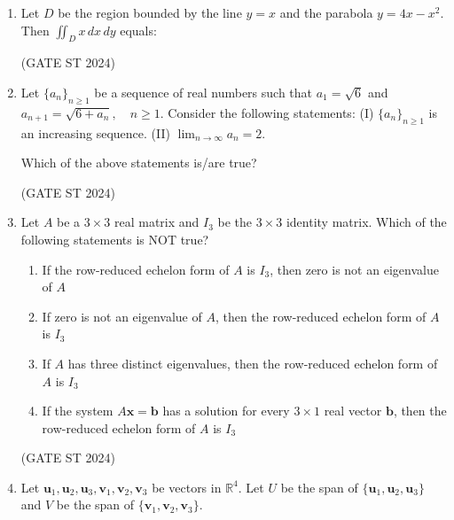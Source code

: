 \documentclass[journal,12pt,onecolumn]{IEEEtran}
\theoremstyle{remark}
\begin{document}
\begin{enumerate}
\item 
Let $D$ be the region bounded by the line $y = x$ and the parabola $y = 4x - x^2$. Then
$
\iint_{D} x \, dx \, dy
$
equals:

\begin{enumerate}
\end{enumerate}
\hfill (GATE ST 2024)
\item 
Let $\{a_n\}_{n \ge 1}$ be a sequence of real numbers such that $a_1 = \sqrt{6}$ and
$
a_{n+1} = \sqrt{6 + a_n}, \quad n \ge 1.
$
Consider the following statements:  
(I) $\{a_n\}_{n \ge 1}$ is an increasing sequence.  
(II) $\lim_{n \to \infty} a_n = 2$.

Which of the above statements is/are true?

\begin{enumerate}
\end{enumerate}
\hfill (GATE ST 2024)
\item 
Let $A$ be a $3 \times 3$ real matrix and $I_3$ be the $3 \times 3$ identity matrix.  
Which of the following statements is NOT true?

\begin{enumerate}

\item If the row-reduced echelon form of $A$ is $I_3$, then zero is not an eigenvalue of $A$
\item If zero is not an eigenvalue of $A$, then the row-reduced echelon form of $A$ is $I_3$
\item If $A$ has three distinct eigenvalues, then the row-reduced echelon form of $A$ is $I_3$
\item If the system $A \mathbf{x} = \mathbf{b}$ has a solution for every $3\times 1$ real vector $\mathbf{b}$, then the row-reduced echelon form of $A$ is $I_3$
\end{enumerate}
\hfill (GATE ST 2024)
\item 
Let $\mathbf{u}_1, \mathbf{u}_2, \mathbf{u}_3, \mathbf{v}_1, \mathbf{v}_2, \mathbf{v}_3$ be vectors in $\mathbb{R}^4$. Let $U$ be the span of $\{\mathbf{u}_1, \mathbf{u}_2, \mathbf{u}_3\}$ and $V$ be the span of $\{\mathbf{v}_1, \mathbf{v}_2, \mathbf{v}_3\}$.  


\end{enumerate}
\end{document}
